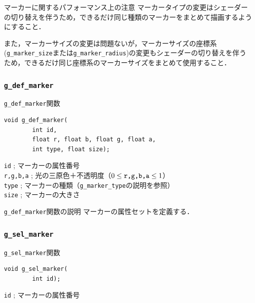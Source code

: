 \documentclass[platex,a4paper,12pt]{jsarticle}%
\begin{document}
\begin{itembox}[l]{マーカーに関するパフォーマンス上の注意}
マーカータイプの変更はシェーダーの切り替えを伴うため，できるだけ同じ種類のマーカーをまとめて描画するようにすること．

また，マーカーサイズの変更は問題ないが，マーカーサイズの座標系(\verb|g_marker_size|または\verb|g_marker_radius|)の変更もシェーダーの切り替えを伴うため，できるだけ同じ座標系のマーカーサイズをまとめて使用すること．
\end{itembox}

\clearpage
\subsubsection{\texttt{g\_def\_marker}}

\begin{itembox}[l]{\texttt{g\_def\_marker}関数}
\begin{verbatim}
void g_def_marker(
        int id,
        float r, float b, float g, float a,
        int type, float size);
\end{verbatim}
\verb|id| ; マーカーの属性番号\\
\verb|r,g,b,a| ; 光の三原色＋不透明度（$0\leq \verb|r,g,b,a| \leq 1$）\\
\verb|type| ; マーカーの種類（\verb|g_marker_type|の説明を参照）\\
\verb|size| ; マーカーの大きさ\\
\end{itembox}

\begin{itembox}[l]{\texttt{g\_def\_marker}関数の説明}
マーカーの属性セットを定義する．
\end{itembox}

\subsubsection{\texttt{g\_sel\_marker}}

\begin{itembox}[l]{\texttt{g\_sel\_marker}関数}
\begin{verbatim}
void g_sel_marker(
        int id);
\end{verbatim}
\verb|id| ; マーカーの属性番号\\
\end{itembox}
\end{document}
